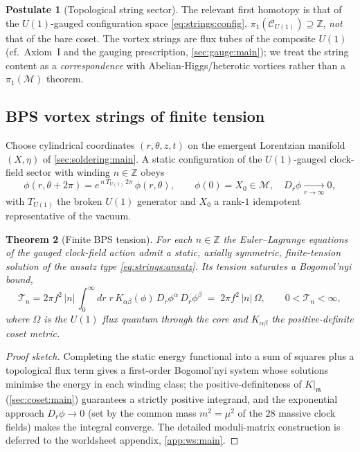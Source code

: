 \documentclass[11pt]{article}
\theoremstyle{plain}
\newtheorem{theorem}{Theorem}[section]
\theoremstyle{definition}
\newtheorem{postulate}[theorem]{Postulate}
\theoremstyle{remark}
\begin{document}
\begin{postulate}[Topological string sector]
\label{post:strings:sector}
The relevant first homotopy is that of the $U(1)$-gauged configuration
space \eqref{eq:strings:config}, $\pi_{1}(\mathcal{C}_{U(1)})\supseteq
\mathbb{Z}$, \emph{not} that of the bare coset. The vortex strings are
flux tubes of the composite $U(1)$ (cf.\ Axiom~I and the gauging
prescription, \autoref{sec:gauge:main}); we treat the string content as a
\emph{correspondence} with Abelian-Higgs/heterotic vortices rather than a
$\pi_{1}(\mathcal{M})$ theorem.
\end{postulate}

\subsection{BPS vortex strings of finite tension}
\label{sec:strings:bps}

Choose cylindrical coordinates $(r,\theta,z,t)$ on the emergent
Lorentzian manifold $(X,\eta)$ of \autoref{sec:soldering:main}. A static
configuration of the $U(1)$-gauged clock-field sector with winding
$n\in\mathbb{Z}$ obeys
\begin{equation}
  \phi(r,\theta+2\pi)=e^{\,n\,T_{U(1)}\,2\pi}\,\phi(r,\theta),
  \qquad
  \phi(0)=X_{0}\in\mathcal{M},\quad
  D_{r}\phi\xrightarrow[r\to\infty]{}0,
  \label{eq:strings:ansatz}
\end{equation}
with $T_{U(1)}$ the broken $U(1)$ generator and $X_{0}$ a rank-$1$
idempotent representative of the vacuum.

\begin{theorem}[Finite BPS tension]
\label{thm:strings:tension}
For each $n\in\mathbb{Z}$ the Euler--Lagrange equations of the gauged
clock-field action admit a static, axially symmetric, finite-tension
solution of the ansatz type \eqref{eq:strings:ansatz}. Its tension
saturates a Bogomol'nyi bound,
\begin{equation}
  \mathcal{T}_{n}
   = 2\pi f^{2}\,|n|\,
     \int_{0}^{\infty}\!dr\;
     r\,K_{\alpha\beta}(\phi)\,
     D_{r}\phi^{\alpha}\,D_{r}\phi^{\beta}
   \;=\; 2\pi f^{2}\,|n|\,\Omega,
  \qquad 0<\mathcal{T}_{n}<\infty,
  \label{eq:strings:tension}
\end{equation}
where $\Omega$ is the $U(1)$ flux quantum through the core and
$K_{\alpha\beta}$ the positive-definite coset metric.
\end{theorem}

\begin{proof}[Proof sketch]
Completing the static energy functional into a sum of squares plus a
topological flux term gives a first-order Bogomol'nyi system whose
solutions minimise the energy in each winding class; the
positive-definiteness of $K|_{\mathfrak m}$ (\autoref{sec:coset:main})
guarantees a strictly positive integrand, and the exponential approach
$D_{r}\phi\to0$ (set by the common mass $m^{2}=\mu^{2}$ of the $28$
massive clock fields) makes the integral converge. The detailed
moduli-matrix construction is deferred to the worldsheet appendix,
\autoref{app:ws:main}.
\end{proof}
\end{document}
